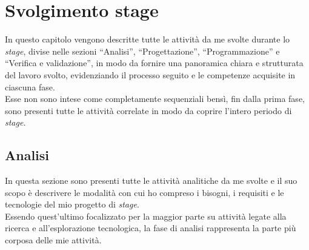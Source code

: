 \chapter{Svolgimento stage}
\label{cap:svolgimentoStage}
In questo capitolo vengono descritte tutte le attività da me svolte durante lo \emph{stage}, divise nelle sezioni “Analisi”, “Progettazione”, “Programmazione” e “Verifica e validazione”, in modo da fornire una panoramica chiara e strutturata del lavoro svolto, evidenziando il processo seguito e le competenze acquisite in ciascuna fase.\\
Esse non sono intese come completamente sequenziali bensì, fin dalla prima fase, sono presenti tutte le attività correlate in modo da coprire l'intero periodo di \emph{stage}.\\
\section{Analisi}
In questa sezione sono presenti tutte le attività analitiche da me svolte e il suo scopo è descrivere le modalità con cui ho compreso i bisogni, i requisiti e le tecnologie del mio progetto di \emph{stage}.\\
Essendo quest'ultimo focalizzato per la maggior parte su attività legate alla ricerca e all'esplorazione tecnologica, la fase di analisi rappresenta la parte più corposa delle mie attività.\\

